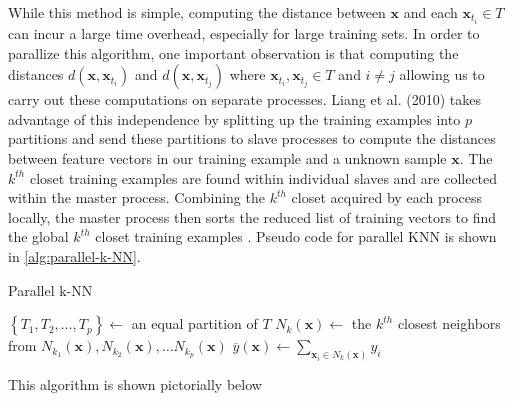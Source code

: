 While this method is simple, computing the distance between $\bm{x}$ and each $\bm{x}_{t_i} \in T$ can incur a large time overhead, especially for large training sets. In order to parallize this algorithm, one important observation is that computing the distances $d \left( \bm{x}, \bm{x}_{t_i} \right)$ and $d \left( \bm{x}, \bm{x}_{t_j} \right)$ where $\bm{x}_{t_i}, \bm{x}_{t_j} \in T$ and $i \neq j$ allowing us to carry out these computations on separate processes. Liang et al. (2010) takes advantage of this independence by splitting up the training examples into $p$ partitions and send these partitions to slave processes to compute the distances between feature vectors in our training example and a unknown sample $\bm{x}$. The $k^{th}$ closet training examples are found within individual slaves and are collected within the master process. Combining the $k^{th}$ closet acquired by each process locally, the master process then sorts the reduced list of training vectors to find the global $k^{th}$ closet training examples \cite{ShenshenLiang2010Daeo}. Pseudo code for parallel KNN is shown in \ref{alg:parallel-k-NN}.
\begin{algorithm}[h!!!]
\caption{Parallel k-NN}
\label{alg:parallel-k-NN}
\SetAlgoLined
    \BlankLine
    $\left\lbrace T_{1} , T_{2}, \ldots , T_{p} \right\rbrace \gets$ an equal partition of $T$\;
    $N_{k} (\bm{x}) \gets$ the $k^{th}$ closest neighbors from $N_{k_1} (\bm{x}), N_{k_2} (\bm{x}), \ldots N_{k_p} (\bm{x})$\;
    $\overline{y} \left( \bm{x} \right) \gets \sum_{\bm{x}_{i} \in N_{k} (\bm{x})} y_{i}$\;
    \BlankLine
\end{algorithm}
This algorithm is shown pictorially below
